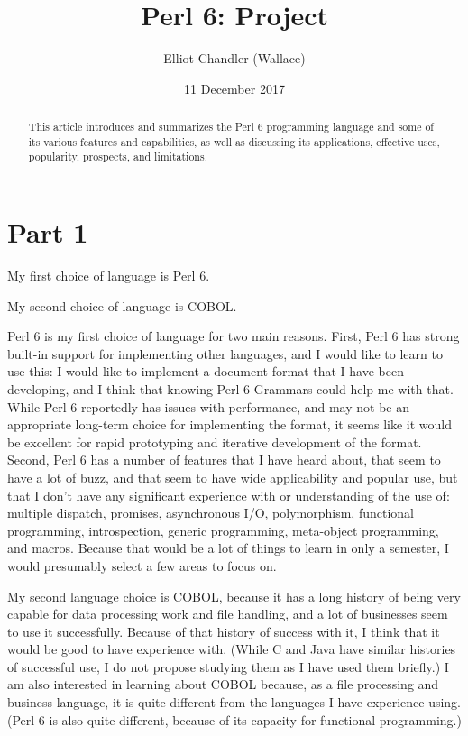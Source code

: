 \documentclass[14pt,english]{extarticle}
\begin{document}
\title{Perl 6: Project}


\author{Elliot Chandler (Wallace)}


\date{11 December 2017}
\maketitle
\begin{abstract}
This article introduces and summarizes the Perl 6 programming language
and some of its various features and capabilities, as well as discussing
its applications, effective uses, popularity, prospects, and limitations.
\end{abstract}

\part*{Part 1}

My first choice of language is Perl 6.

My second choice of language is COBOL.

Perl 6 is my first choice of language for two main reasons. First,
Perl 6 has strong built-in support for implementing other languages,
and I would like to learn to use this: I would like to implement a
document format that I have been developing, and I think that knowing
Perl 6 Grammars could help me with that. While Perl 6 reportedly has
issues with performance, and may not be an appropriate long-term choice
for implementing the format, it seems like it would be excellent for
rapid prototyping and iterative development of the format. Second,
Perl 6 has a number of features that I have heard about, that seem
to have a lot of \textquotedbl{}buzz\textquotedbl{}, and that seem
to have wide applicability and popular use, but that I don't have
any significant experience with or understanding of the use of: multiple
dispatch, promises, asynchronous I/O, polymorphism, functional programming,
introspection, generic programming, meta-object programming, and macros.
Because that would be a lot of things to learn in only a semester,
I would presumably select a few areas to focus on.

My second language choice is COBOL, because it has a long history
of being very capable for data processing work and file handling,
and a lot of businesses seem to use it successfully. Because of that
history of success with it, I think that it would be good to have
experience with. (While C and Java have similar histories of successful
use, I do not propose studying them as I have used them briefly.)
I am also interested in learning about COBOL because, as a file processing
and business language, it is quite different from the languages I
have experience using. (Perl 6 is also quite different, because of
its capacity for functional programming.)
\end{document}
